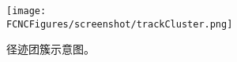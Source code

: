 \begin{figure}[htb]
\centering
\texttt{[image: \\FCNCFigures/screenshot/trackCluster.png]}
\caption{径迹团簇示意图。}
\label{fig:trackCluster}
\end{figure}